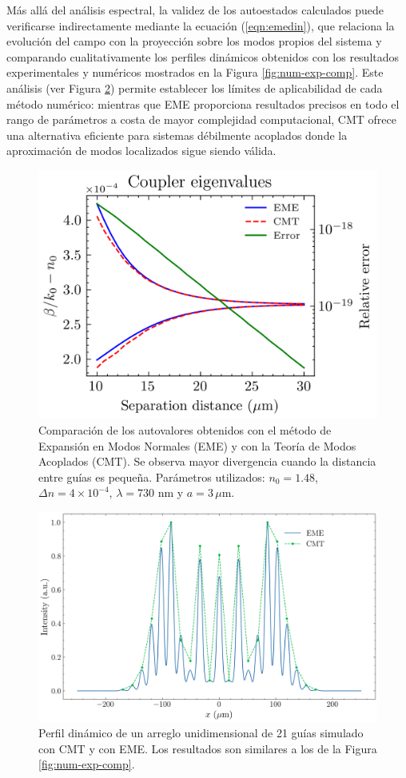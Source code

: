 Más allá del análisis espectral, la validez de los autoestados calculados puede verificarse indirectamente mediante la ecuación (\ref{eqn:emedin}), que relaciona la evolución del campo con la proyección sobre los modos propios del sistema y comparando cualitativamente los perfiles dinámicos obtenidos con los resultados experimentales y numéricos mostrados en la Figura \ref{fig:num-exp-comp}. Este análisis (ver Figura \ref{fig:1darraycmt}) permite establecer los límites de aplicabilidad de cada método numérico: mientras que EME proporciona resultados precisos en todo el rango de parámetros a costa de mayor complejidad computacional, CMT ofrece una alternativa eficiente para sistemas débilmente acoplados donde la aproximación de modos localizados sigue siendo válida.
\begin{figure}[h]
    \centering
    \includegraphics[width=0.8\linewidth]{codigo/dimol/coupler.png}
    \caption[Comparación entre EME y CMT.]{Comparación de los autovalores obtenidos con el método de Expansión en Modos Normales (EME) y con la Teoría de Modos Acoplados (CMT). Se observa mayor divergencia cuando la distancia entre guías es pequeña. Parámetros utilizados: $n_0=1.48$, $\Delta n = 4\times10^{-4}$, $\lambda = 730$ nm y $a = 3\,\mu$m.}
    \label{fig:EMECMT}
\end{figure}
\begin{figure}[h]
	\centering
	\includegraphics[width=0.8\linewidth]{codigo/1darraycmt/1darraycmt.png}
	\caption[Dinámica con EME y CMT.]{Perfil dinámico de un arreglo unidimensional de 21 guías simulado con CMT y con EME. Los resultados son similares a los de la Figura \ref{fig:num-exp-comp}.}
	\label{fig:1darraycmt}
\end{figure}
